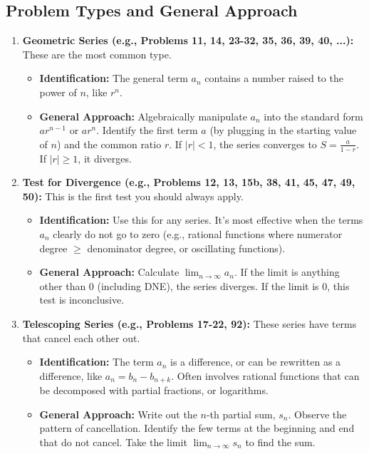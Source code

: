 \documentclass{article}
\begin{document}
\subsection{Problem Types and General Approach}
\begin{enumerate}
    \item \textbf{Geometric Series (e.g., Problems 11, 14, 23-32, 35, 36, 39, 40, ...):} These are the most common type.
        \begin{itemize}
            \item \textbf{Identification:} The general term $a_n$ contains a number raised to the power of $n$, like $r^n$.
            \item \textbf{General Approach:} Algebraically manipulate $a_n$ into the standard form $ar^{n-1}$ or $ar^n$. Identify the first term $a$ (by plugging in the starting value of $n$) and the common ratio $r$. If $|r| < 1$, the series converges to $S = \frac{a}{1-r}$. If $|r| \ge 1$, it diverges.
        \end{itemize}
    \item \textbf{Test for Divergence (e.g., Problems 12, 13, 15b, 38, 41, 45, 47, 49, 50):} This is the first test you should always apply.
        \begin{itemize}
            \item \textbf{Identification:} Use this for any series. It's most effective when the terms $a_n$ clearly do not go to zero (e.g., rational functions where numerator degree $\ge$ denominator degree, or oscillating functions).
            \item \textbf{General Approach:} Calculate $\lim_{n \to \infty} a_n$. If the limit is anything other than 0 (including DNE), the series diverges. If the limit is 0, this test is inconclusive.
        \end{itemize}
    \item \textbf{Telescoping Series (e.g., Problems 17-22, 92):} These series have terms that cancel each other out.
        \begin{itemize}
            \item \textbf{Identification:} The term $a_n$ is a difference, or can be rewritten as a difference, like $a_n = b_n - b_{n+k}$. Often involves rational functions that can be decomposed with partial fractions, or logarithms.
            \item \textbf{General Approach:} Write out the $n$-th partial sum, $s_n$. Observe the pattern of cancellation. Identify the few terms at the beginning and end that do not cancel. Take the limit $\lim_{n \to \infty} s_n$ to find the sum.

\end{itemize}
\end{enumerate}
\end{document}
